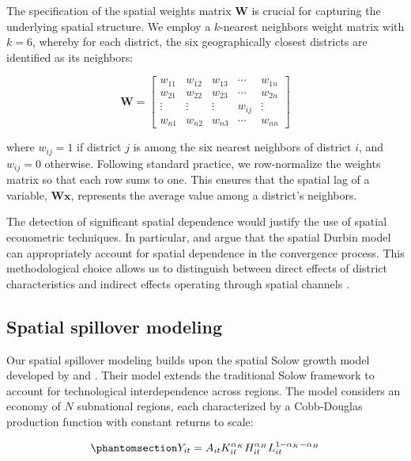 \documentclass[
  a4paper, 
  twoside,
  review
]{article}
\begin{document}
The specification of the spatial weights matrix \(\mathbf{W}\) is
crucial for capturing the underlying spatial structure. We employ a
\(k\)-nearest neighbors weight matrix with \(k = 6\), whereby for each
district, the six geographically closest districts are identified as its
neighbors:

\[
\mathbf{W}=\left[\begin{array}{ccccc}
w_{11} & w_{12} & w_{13} & \cdots & w_{1n} \\
w_{21} & w_{22} & w_{23} & \cdots & w_{2n} \\
\vdots & \vdots & \vdots & w_{ij} & \vdots \\
w_{n1} & w_{n2} & w_{n3} & \cdots & w_{nn}
\end{array}\right]
\]

where \(w_{ij} = 1\) if district \(j\) is among the six nearest
neighbors of district \(i\), and \(w_{ij} = 0\) otherwise. Following
standard practice, we row-normalize the weights matrix so that each row
sums to one. This ensures that the spatial lag of a variable,
\(\mathbf{W} \mathbf{x}\), represents the average value among a
district's neighbors.

The detection of significant spatial dependence would justify the use of
spatial econometric techniques. In particular,
\citet{ertur_koch_spatial_growth} and \citet{fischer_spatial_mrw} argue
that the spatial Durbin model can appropriately account for spatial
dependence in the convergence process. This methodological choice allows
us to distinguish between direct effects of district characteristics and
indirect effects operating through spatial channels
\citep{lesage_pace_spatial_econometrics}.

\subsection{Spatial spillover
modeling}\label{spatial-spillover-modeling}

Our spatial spillover modeling builds upon the spatial Solow growth
model developed by \citet{ertur_koch_spatial_growth} and
\citet{fischer_spatial_mrw}. Their model extends the traditional Solow
framework to account for technological interdependence across regions.
The model considers an economy of \(N\) subnational regions, each
characterized by a Cobb-Douglas production function with constant
returns to scale:

\begin{equation}\phantomsection\label{eq-production}{
Y_{i t}=A_{i t} K_{i t}^{\alpha_{K}} H_{i t}^{\alpha_{H}} L_{i t}^{1-\alpha_{K} -\alpha_{H}}
}\end{equation}
\end{document}
